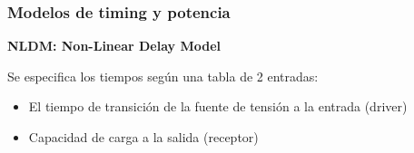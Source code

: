 \documentclass{beamer}
\begin{document}
\begin{frame}
  \begin{figure}[ht]
      \centering
    \end{figure}
  
\end{frame}

\begin{frame}
  \frametitle{Modelos de timing y potencia} 

 \textbf{NLDM: Non-Linear Delay Model} 
   \begin{figure}[ht]
      \centering
    \end{figure}
    Se especifica los tiempos según una tabla de 2 entradas:
    \begin{itemize}
	\item El tiempo de transición de la fuente de tensión a la entrada (driver)
	\item Capacidad de carga a la salida (receptor)
\end{itemize}

\end{frame}
\end{document}
